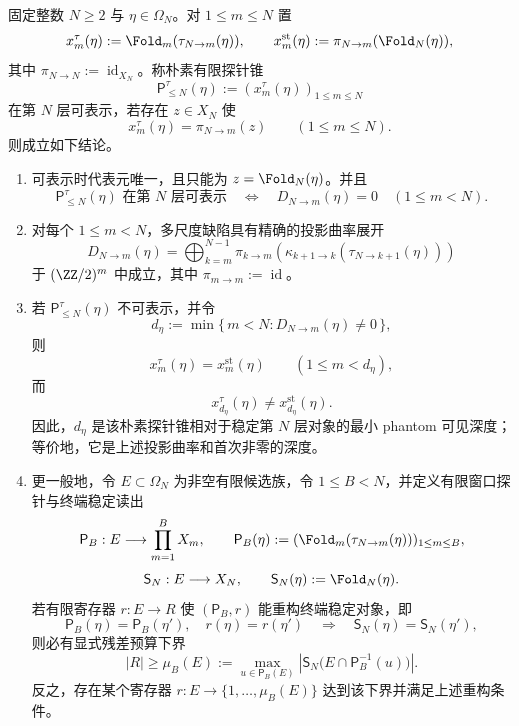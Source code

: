 \begin{theorem}\label{distill:grothendieck-probe_representability_and_reconstruction-pom-finite-probe-minimal-phantom-depth}
固定整数 \(N\ge2\) 与 \(\eta\in\Omega_N\)。对 \(1\le m\le N\) 置
\[
x_m^\tau(\eta):=\Fold_m(\tau_{N\to m}(\eta)),\qquad
x_m^{\mathrm{st}}(\eta):=\pi_{N\to m}(\Fold_N(\eta)),
\]
其中 \(\pi_{N\to N}:=\operatorname{id}_{X_N}\)。称朴素有限探针锥
\[
\mathsf P^\tau_{\le N}(\eta):=(x_m^\tau(\eta))_{1\le m\le N}
\]
在第 \(N\) 层可表示，若存在 \(z\in X_N\) 使
\[
x_m^\tau(\eta)=\pi_{N\to m}(z)\qquad(1\le m\le N).
\]
则成立如下结论。
\begin{enumerate}
  \item 可表示时代表元唯一，且只能为 \(z=\Fold_N(\eta)\)。并且
  \[
  \mathsf P^\tau_{\le N}(\eta)\text{ 在第 }N\text{ 层可表示}
  \quad\Longleftrightarrow\quad
  D_{N\to m}(\eta)=0\quad(1\le m<N).
  \]
  \item 对每个 \(1\le m<N\)，多尺度缺陷具有精确的投影曲率展开
  \[
  \boxed{\;
  D_{N\to m}(\eta)
  =
  \bigoplus_{k=m}^{N-1}
  \pi_{k\to m}\!\left(
  \kappa_{k+1\to k}(\tau_{N\to k+1}(\eta))
  \right)
  \;}
  \]
  于 \((\ZZ/2)^m\) 中成立，其中 \(\pi_{m\to m}:=\operatorname{id}\)。
  \item 若 \(\mathsf P^\tau_{\le N}(\eta)\) 不可表示，并令
  \[
  d_\eta:=\min\{\,m<N:D_{N\to m}(\eta)\ne0\,\},
  \]
  则
  \[
  x_m^\tau(\eta)=x_m^{\mathrm{st}}(\eta)\qquad(1\le m<d_\eta),
  \]
  而
  \[
  x_{d_\eta}^\tau(\eta)\ne x_{d_\eta}^{\mathrm{st}}(\eta).
  \]
  因此，\(d_\eta\) 是该朴素探针锥相对于稳定第 \(N\) 层对象的最小 phantom 可见深度；等价地，它是上述投影曲率和首次非零的深度。
  \item 更一般地，令 \(E\subset\Omega_N\) 为非空有限候选族，令 \(1\le B<N\)，并定义有限窗口探针与终端稳定读出
  \[
  \mathsf P_B:E\longrightarrow\prod_{m=1}^{B}X_m,\qquad
  \mathsf P_B(\eta):=(\Fold_m(\tau_{N\to m}(\eta)))_{1\le m\le B},
  \]
  \[
  \mathsf S_N:E\longrightarrow X_N,\qquad
  \mathsf S_N(\eta):=\Fold_N(\eta).
  \]
  若有限寄存器 \(r:E\to R\) 使 \((\mathsf P_B,r)\) 能重构终端稳定对象，即
  \[
  \mathsf P_B(\eta)=\mathsf P_B(\eta'),\quad r(\eta)=r(\eta')
  \quad\Longrightarrow\quad
  \mathsf S_N(\eta)=\mathsf S_N(\eta'),
  \]
  则必有显式残差预算下界
  \[
  |R|\ge
  \mu_B(E):=\max_{u\in\mathsf P_B(E)}
  \left|\mathsf S_N\bigl(E\cap\mathsf P_B^{-1}(u)\bigr)\right|.
  \]
  反之，存在某个寄存器 \(r:E\to\{1,\ldots,\mu_B(E)\}\) 达到该下界并满足上述重构条件。
\end{enumerate}
\end{theorem}

